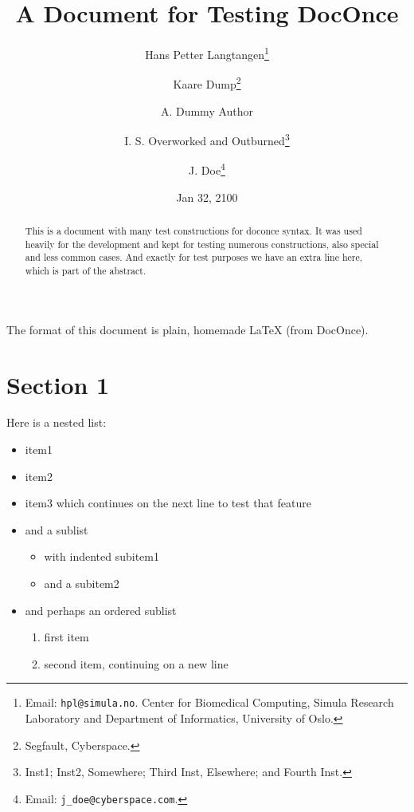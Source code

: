 \documentclass[%
oneside,                 %
final,                   %
10pt]{article}
\theoremstyle{definition}
\begin{document}
\newcommand{\exercisesection}[1]{\subsection*{#1}}


\title{A Document for Testing DocOnce}
\author{Hans Petter Langtangen\footnote{Email: \texttt{hpl@simula.no}. Center for Biomedical Computing, Simula Research Laboratory and Department of Informatics, University of Oslo.}
\and Kaare Dump\footnote{Segfault, Cyberspace.}
\and A. Dummy Author
\and I. S. Overworked and Outburned\footnote{Inst1; Inst2, Somewhere; Third Inst, Elsewhere; and Fourth Inst.}
\and J. Doe\footnote{Email: \texttt{j\_doe@cyberspace.com}.}}
\date{Jan 32, 2100}
\maketitle
\tableofcontents
\vspace{1cm} %
The format of this document is
plain, homemade {\LaTeX} (from DocOnce).
\begin{abstract}
This is a document with many test constructions for doconce syntax.
It was used heavily for the development and kept for testing
numerous constructions, also special and less common cases.
And exactly for test purposes we have an extra line here, which
is part of the abstract.
\end{abstract}
\section{Section 1}
\label{sec1}
Here is a nested list:
\begin{itemize}
  \item item1
  \item item2
  \item item3 which continues
    on the next line to test that feature
  \item and a sublist
\begin{itemize}
    \item with indented subitem1
    \item and a subitem2
\end{itemize}
\noindent
  \item and perhaps an ordered sublist
\begin{enumerate}
   \item first item
   \item second item,
      continuing on a new line
\end{enumerate}
\noindent
\end{itemize}
\noindent
\end{document}
